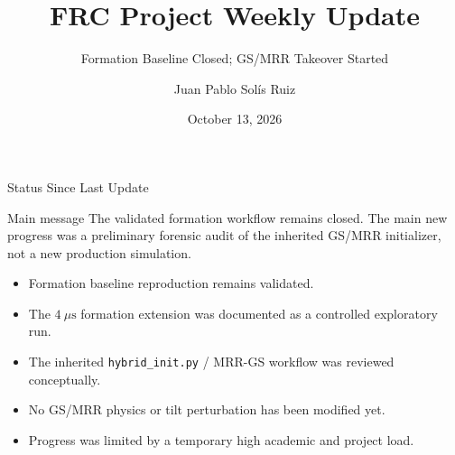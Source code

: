 \documentclass[10pt,aspectratio=169]{beamer}
\title[FRC Weekly Update]{FRC Project Weekly Update}
\subtitle{Formation Baseline Closed; GS/MRR Takeover Started}
\author{Juan Pablo Solís Ruiz}
\institute{USTC --- Supervisor: Prof. Ren Haijun}
\date{October 13, 2026}
\begin{document}
\begin{frame}
    \titlepage
\end{frame}

\begin{frame}{Status Since Last Update}
    \begin{block}{Main message}
        The validated formation workflow remains closed. The main new progress
        was a preliminary forensic audit of the inherited GS/MRR initializer,
        not a new production simulation.
    \end{block}

    \vspace{0.3cm}

    \begin{itemize}
        \item Formation baseline reproduction remains validated.
        \item The \(4~\mu\mathrm{s}\) formation extension was documented as a
        controlled exploratory run.
        \item The inherited \texttt{hybrid\_init.py} / MRR-GS workflow was
        reviewed conceptually.
        \item No GS/MRR physics or tilt perturbation has been modified yet.
        \item Progress was limited by a temporary high academic and project load.
    \end{itemize}
\end{frame}
\end{document}
